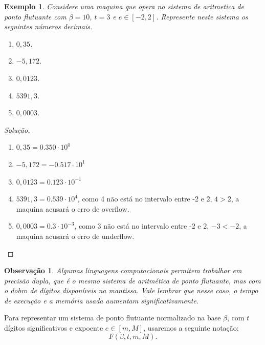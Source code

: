 \documentclass[
	12pt,				%
	openright,			%
	twoside,			%
	a4paper,			%
	english,			%
	french,				%
	brazil,				%
	sumario=tradicional
]{abntex2}
\newtheorem{example}{Exemplo}
\newtheorem{remark}{Observação}
\newenvironment{solution}{
	\begin{proof}[Solução]
}{\end{proof}}
\numberwithin{example}{chapter}
\numberwithin{remark}{chapter}
\numberwithin{definition}{chapter}
\numberwithin{figure}{chapter}
\begin{document}
\begin{example}
    Considere uma maquina que opera no sistema de aritmetica de ponto flutuante com $\beta=10$, $t=3$ e $e\in [-2, 2]$. Represente neste sistema os seguintes números decimais.
	\begin{enumerate}
        \item $0,35$.
        \item $-5,172$.
        \item $0,0123$.
        \item $5391,3$.
        \item $0,0003$.
    \end{enumerate}
\end{example}
\begin{solution}\hfill
    \begin{enumerate}
        \item $0,35 = 0.350\cdot 10^0$
        \item $-5,172 = -0.517\cdot 10^1$
        \item $0,0123 = 0.123\cdot 10^{-1}$
        \item $5391,3 = 0.539\cdot 10^4$, como 4 não está no intervalo entre -2 e 2, $4 > 2$, a maquina acusará o erro de overflow.
        \item $0,0003 = 0.3\cdot 10^{-3}$, como 3 não está no intervalo entre -2 e 2, $-3 < -2$, a maquina acusará o erro de underflow.
    \end{enumerate}
\end{solution}

\begin{remark}
	Algumas linguagens computacionais permitem trabalhar em precisão dupla, que é o mesmo sistema de aritmética de ponto flutuante, mas com o dobro de dígitos disponíveis na mantissa. Vale lembrar que nesse caso, o tempo de execução e a memória usada aumentam significativamente.
\end{remark}

Para representar um sistema de ponto flutuante normalizado na base $\beta$, com $t$ dígitos significativos e expoente $e \in [m, M]$, usaremos a seguinte notação:
$$F(\beta, t, m, M)\text{.}$$
\end{document}

